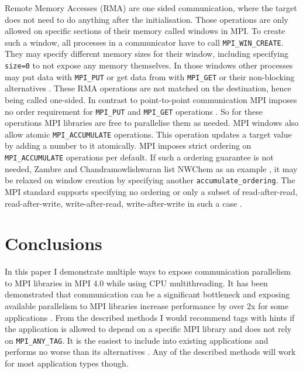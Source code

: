 \documentclass[sigconf]{acmart}
\begin{document}
Remote Memory Accesses (RMA) are one sided communication, where the target does not need to do anything after the initialisation.
Those operations are only allowed on specific sections of their memory called windows in MPI.
To create such a window, all processes in a communicator have to call \verb|MPI_WIN_CREATE|.
They may specify different memory sizes for their window, including specifying \verb|size=0| to not expose any memory themselves.
In those windows other processes may put data with \verb|MPI_PUT| or get data from with \verb|MPI_GET| or their non-blocking alternatives \cite{mpi40}.
These RMA operations are not matched on the destination, hence being called one-sided.
In contrast to point-to-point communication MPI imposes no order requirement for \verb|MPI_PUT| and \verb|MPI_GET| operations \cite{mpi40}.
So for these operations MPI libraries are free to parallelise them as needed.
MPI windows also allow atomic \verb|MPI_ACCUMULATE| operations.
This operation updates a target value by adding a number to it atomically.
MPI imposes strict ordering on \verb|MPI_ACCUMULATE| operations per default.
If such a ordering guarantee is not needed, Zambre and Chandramowlishwaran list NWChem as an example \cite{zambreLessonsLearned2022}, it may be relaxed on window creation by specifying another \verb|accumulate_ordering|.
The MPI standard supports specifying no ordering or only a subset of read-after-read, read-after-write, write-after-read, write-after-write in such a case \cite{mpi40}.

\section{Conclusions}

In this paper I demonstrate multiple ways to expose communication parallelism to MPI libraries in MPI 4.0 while using CPU multithreading.
It has been demonstrated that communication can be a significant bottleneck and exposing available parallelism to MPI libraries increase performance by over 2x for some applications \cite{zambreLogicalParallel2021}.
From the described methods I would recommend tags with hints if the application is allowed to depend on a specific MPI library and does not rely on \verb|MPI_ANY_TAG|.
It is the easiest to include into existing applications and performs no worse than its alternatives \cite{zambreLessonsLearned2022}.
Any of the described methods will work for most application types though.




\end{document}
